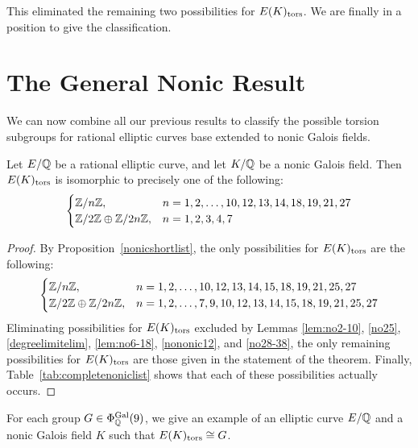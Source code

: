 This eliminated the remaining two possibilities for $E(K)_{\text{tors}}$. We are finally in a position to give the classification. 





\section{The General Nonic Result\label{sec:gennonic}}

We can now combine all our previous results to classify the possible torsion subgroups for rational elliptic curves base extended to nonic Galois fields. 


\begin{thm} \label{thm:nonicclassification}
Let $E/\mathbb{Q}$ be a rational elliptic curve, and let $K/\mathbb{Q}$ be a nonic Galois field. Then $E(K)_{\text{tors}}$ is isomorphic to precisely one of the following:
	\[
	\begin{cases}
	\mathbb{Z}/n\mathbb{Z}, & n= 1, 2, \ldots, 10, 12, 13, 14, 18, 19, 21, 27 \\
	\mathbb{Z}/2\mathbb{Z} \oplus \mathbb{Z}/2n\mathbb{Z}, & n= 1, 2, 3, 4, 7
	\end{cases}
	\]
\end{thm}

\begin{proof}
By Proposition~\ref{nonicshortlist}, the only possibilities for $E(K)_{\text{tors}}$ are the following:
	\[
	\begin{cases}
	\mathbb{Z}/n\mathbb{Z}, & n= 1, 2, \ldots, 10, 12, 13, 14, 15, 18, 19, 21, 25, 27 \\
	\mathbb{Z}/2\mathbb{Z} \oplus \mathbb{Z}/2n\mathbb{Z}, & n= 1, 2, \ldots, 7, 9, 10, 12, 13, 14, 15, 18, 19, 21, 25, 27
	\end{cases}
	\]
Eliminating possibilities for $E(K)_{\text{tors}}$ excluded by Lemmas \ref{lem:no2-10}, \ref{no25}, \ref{degreelimitelim}, \ref{lem:no6-18}, \ref{nononic12}, and \ref{no28-38}, the only remaining possibilities for $E(K)_{\text{tors}}$ are those given in the statement of the theorem. Finally, Table~\ref{tab:completenoniclist} shows that each of these possibilities actually occurs. 
\end{proof}


For each group $G \in \Phi_{\mathbb{Q}}^{\operatorname{Gal}}(9)$, we give an example of an elliptic curve $E/\mathbb{Q}$ and a nonic Galois field $K$ such that $E(K)_{\text{tors}} \cong G$. 


